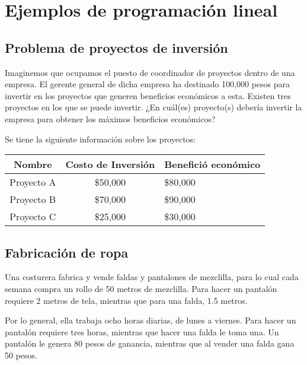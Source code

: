 \section{Ejemplos de programación lineal}

%
%

\subsection{Problema de proyectos de
	inversión}\label{problema-de-proyectos-de-inversiuxf3n}

Imaginemos que ocupamos el puesto de coordinador de proyectos dentro de
una empresa. El gerente general de dicha empresa ha destinado 100,000
pesos para invertir en los proyectos que generen beneficios económicos a
esta. Existen tres proyectos en los que se puede invertir. ¿En cuál(es)
proyecto(s) debería invertir la empresa para obtener los máximos
beneficios económicos?

Se tiene la siguiente información sobre los proyectos:

\begin{longtable}[]{@{}ccl@{}}
\toprule
Nombre & Costo de Inversión & Benefició económico \\
\midrule
\endhead
Proyecto A & \$50,000 & \$80,000 \\
Proyecto B & \$70,000 & \$90,000 \\
Proyecto C & \$25,000 & \$30,000 \\
\bottomrule
\end{longtable}



\subsection{Fabricación de ropa}\label{fabricaciuxf3n-de-ropa}

Una costurera fabrica y vende faldas y pantalones de mezclilla, para lo
cual cada semana compra un rollo de 50 metros de mezclilla. Para hacer
un pantalón requiere 2 metros de tela, mientras que para una falda, 1.5
metros.

Por lo general, ella trabaja ocho horas diarias, de lunes a viernes.
Para hacer un pantalón requiere tres horas, mientras que hacer una falda
le toma una. Un pantalón le genera 80 pesos de ganancia, mientras que al
vender una falda gana 50 pesos.

